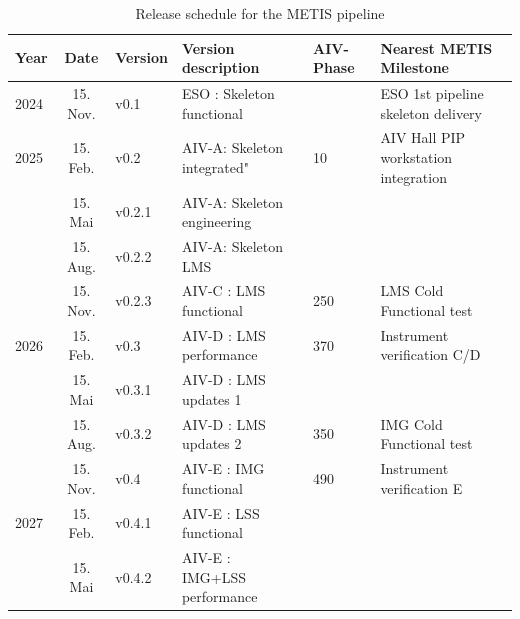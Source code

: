 \documentclass[a4paper]{spie}  %
\begin{document}
\begin{table}[]
\caption{Release schedule for the METIS pipeline}
\label{tab:pip_releases}
\begin{tabular}{|lcllll|}
\hline
Year & Date & Version & Version description & AIV-Phase & Nearest METIS Milestone          \\
\hline
\hline
{2024}          & 15. Nov.      & v0.1             & ESO : Skeleton functional      &                                        & ESO 1st pipeline skeleton delivery   \\
\hline
{2025}          & 15. Feb.      & v0.2             & AIV-A: Skeleton integrated"    & 10                 & AIV Hall PIP workstation integration \\
                                  & 15. Mai       & v0.2.1           & AIV-A: Skeleton engineering  &                                        &                                      \\
                                  & 15. Aug.      & v0.2.2           & AIV-A: Skeleton LMS           &                                        &                                      \\
                                  & 15. Nov.      & v0.2.3           & AIV-C : LMS functional       & {250}                & LMS Cold Functional test             \\
\hline
{2026}          & 15. Feb.      & v0.3             & AIV-D : LMS performance       & {370}                & Instrument verification C/D          \\
                                  & 15. Mai       & v0.3.1           & AIV-D : LMS updates 1         &                                        &                                      \\
                                  & 15. Aug.      & v0.3.2           & AIV-D : LMS updates 2        & {350}                & IMG Cold Functional test             \\
                                  & 15. Nov.      & v0.4             & AIV-E : IMG functional         & {490}                & Instrument verification E            \\
\hline
{2027}          & 15. Feb.      & v0.4.1           & AIV-E : LSS functional      &                                        &                                      \\
                                  & 15. Mai       & v0.4.2           & AIV-E : IMG+LSS performance   &                                        &                                      \\

\end{tabular}
\end{table}
\end{document}
